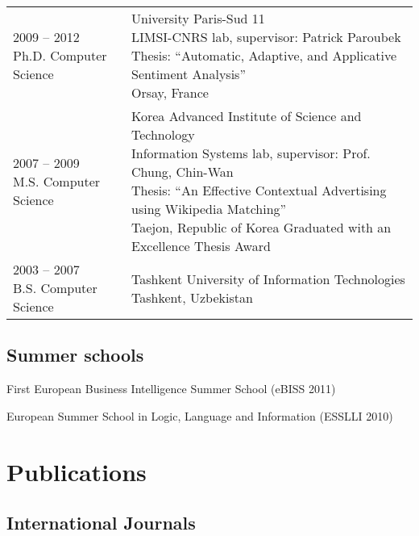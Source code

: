 \documentclass[letterpaper]{article}
\renewenvironment{itemize}{
  \begin{list}{}{
    \setlength{\leftmargin}{0.6em}
  }
}{
  \end{list}
}
\begin{document}
\begin{table}[h]
	\begin{tabular}{ll}
	\parbox[t]{5cm}{
		2009 -- 2012 \\
		Ph.D. Computer Science
	} &
	\parbox[t]{15cm}{
    	University Paris-Sud 11\\
		LIMSI-CNRS lab, supervisor: Patrick Paroubek\\
		Thesis: ``Automatic, Adaptive, and Applicative Sentiment Analysis''\\
		Orsay, France
		\vspace{1em}
    } \\
	\parbox[t]{5cm}{
		2007 -- 2009 \\
		M.S. Computer Science
	} &
	\parbox[t]{15cm}{
		Korea Advanced Institute of Science and Technology\\
		Information Systems lab, supervisor: Prof. Chung, Chin-Wan \\
		Thesis: ``An Effective Contextual Advertising using Wikipedia Matching''\\
		Taejon, Republic of Korea
        Graduated with an Excellence Thesis Award
		\vspace{1em}
    } \\
    \parbox[t]{5cm}{
		2003 -- 2007 \\
		B.S. Computer Science
	} &
	\parbox[t]{15cm}{
		Tashkent University of Information Technologies\\
		Tashkent, Uzbekistan
    } \\    
    \end{tabular}
\end{table}

\subsection*{Summer schools}
\begin{itemize}
\item First European Business Intelligence Summer School (eBISS 2011)
\item European Summer School in Logic, Language and Information (ESSLLI 2010)
\end{itemize}

\section*{Publications}

\subsection*{International Journals}
\end{document}
